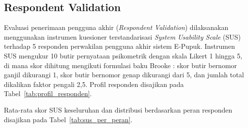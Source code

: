\documentclass[conference]{IEEEtran}
\begin{document}
\subsection{Respondent Validation}
Evaluasi penerimaan pengguna akhir (\textit{Respondent Validation}) dilaksanakan menggunakan instrumen kuesioner terstandarisasi \textit{System Usability Scale} (SUS) terhadap 5 responden perwakilan pengguna akhir sistem E-Pupuk. Instrumen SUS mengukur 10 butir pernyataan psikometrik dengan skala Likert 1 hingga 5, di mana skor dihitung mengikuti formulasi baku Brooke \cite{b19}: skor butir bernomor ganjil dikurangi 1, skor butir bernomor genap dikurangi dari 5, dan jumlah total dikalikan faktor pengali 2,5. Profil responden disajikan pada Tabel~\ref{tab:profil_responden}.

\begin{table}[htbp]
\caption{Profil Responden Pengujian Usabilitas SUS ($n = 5$)}
\begin{center}
\label{tab:profil_responden}
\end{center}
\end{table}

Rata-rata skor SUS keseluruhan dan distribusi berdasarkan peran responden disajikan pada Tabel~\ref{tab:sus_per_peran}.
\end{document}
